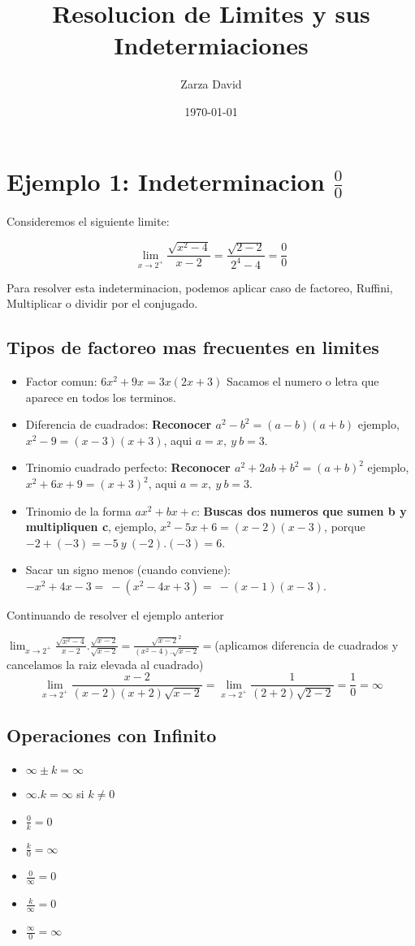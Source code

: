 \documentclass{article}
\title{\textbf{Resolucion de Limites y sus Indetermiaciones}}
\author{Zarza David}
\date{\today}
\begin{document}
\maketitle

\section{Ejemplo 1: Indeterminacion $\frac{0}{0}$}

Consideremos el siguiente limite: 

$$\lim_{x \to 2^+} \frac{\sqrt{x^2 - 4 }}{x -2} = \frac{\sqrt{2-2}}{2^4-4}=\frac{0}{0}$$

Para resolver esta indeterminacion, podemos aplicar caso de factoreo, Ruffini, Multiplicar o dividir por el conjugado.
\subsection{Tipos de factoreo mas frecuentes en limites}

\begin{itemize}
    \item Factor comun: $6x^2 + 9x  = 3x(2x + 3)$ Sacamos el numero o letra que aparece en todos los terminos.
    \item Diferencia de cuadrados: \textbf{Reconocer $a^2 - b^2 = (a-b)(a+b)$} ejemplo, $x^2 - 9 = (x-3)(x+3) $, aqui $a = x,\ y \ b = 3 $.
    \item Trinomio cuadrado perfecto: \textbf{Reconocer $a^2 + 2ab + b^2 = (a+b)^2$} ejemplo, $x^2 + 6x + 9 = (x+3)^2$, aqui $a = x ,\ y \ b= 3$.
    \item Trinomio de la forma $ax^2 + bx + c$: \textbf{Buscas dos numeros que sumen b y multipliquen c}, ejemplo, $x^2 - 5x + 6 = (x-2)(x-3)$, porque $-2 + (-3) = -5 \ y \ (-2).(-3)=6$.
    \item Sacar un signo menos (cuando conviene): $-x^2 + 4x - 3 = \ -(x^2-4x+3)= \ -(x-1)(x-3)$. 
\end{itemize}
Continuando de resolver el ejemplo anterior 

$\lim_{x \to 2^+} \frac{\sqrt{x^2 - 4 }}{x -2} . \frac{\sqrt{x-2 }}{\sqrt{x -2}} = \frac{\sqrt{x-2}^2}{(x^2-4).\sqrt{x-2}}= $(aplicamos diferencia de cuadrados y cancelamos la raiz elevada al cuadrado)
$$ \lim_{x \to 2^+} \frac{x-2}{(x-2)(x+2)\sqrt{x-2}} = \lim_{x \to 2^+} \frac{1}{(2+2)\sqrt{2-2}} = \frac{1}{0} = \infty$$ 
\subsection{Operaciones con Infinito}
\begin{itemize}
    \item $\infty \pm k = \infty $
    \item $\infty . k = \infty $ si $k \neq 0 $
    \item $\frac{0}{k} = 0 $
    \item $\frac{k}{0} = \infty $
    \item $\frac{0}{\infty} = 0 $
    \item $\frac{k}{\infty} = 0$
    \item $\frac{\infty}{0} = \infty$ 
\end{itemize} 
\end{document}
